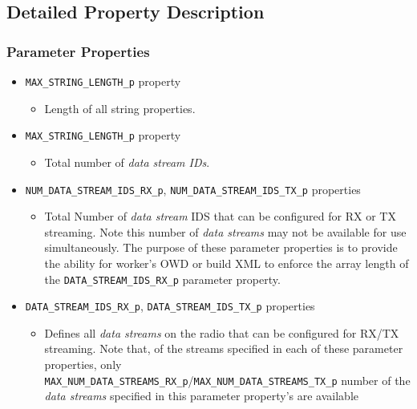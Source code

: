\documentclass{article}
\begin{document}
\subsection{Detailed Property Description}
  \label{sec:detailed_property_description}

  \subsubsection{Parameter Properties}
  \begin{itemize}
    \item \verb+MAX_STRING_LENGTH_p+ property
      \begin{itemize}
        \item Length of all string properties.
      \end{itemize}
    \item \verb+MAX_STRING_LENGTH_p+ property
      \begin{itemize}
        \item Total number of \textit{data stream IDs}.
      \end{itemize}
    \item \verb+NUM_DATA_STREAM_IDS_RX_p+, \verb+NUM_DATA_STREAM_IDS_TX_p+
        properties
      \begin{itemize}
        \item Total Number of \textit{data stream} IDS that can be configured
          for RX or
          TX
          streaming. Note this number of
          \textit{data streams} may not be available for use simultaneously.
          The purpose
          of
          these parameter properties is to provide the ability for worker's OWD
          or
          build XML to enforce the array length of the
          \verb+DATA_STREAM_IDS_RX_p+
          parameter property.
      \end{itemize}
    \item \verb+DATA_STREAM_IDS_RX_p+, \verb+DATA_STREAM_IDS_TX_p+ properties
      \begin{itemize}
        \item Defines all \textit{data streams} on the radio that can be
          configured for
          RX/TX streaming.
          Note that, of the streams specified in each of these parameter
          properties, only \\
          \verb+MAX_NUM_DATA_STREAMS_RX_p+/\verb+MAX_NUM_DATA_STREAMS_TX_p+
          number of
          the \textit{data streams} specified in this parameter property's are
          available

\end{itemize}
\end{itemize}
\end{document}

